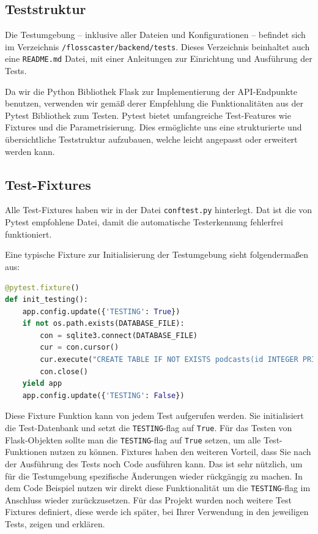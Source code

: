 \documentclass{article}
\begin{document}
\subsection{Teststruktur}
\begin{sloppypar}
Die Testumgebung – inklusive aller Dateien und Konfigurationen – befindet sich im Verzeichnis \texttt{/flosscaster/backend/tests}. Dieses Verzeichnis beinhaltet auch eine \texttt{README.md} Datei, mit einer Anleitungen zur Einrichtung und Ausführung der Tests. 
\end{sloppypar}

Da wir die Python Bibliothek Flask zur Implementierung der API-Endpunkte benutzen, verwenden wir gemäß derer Empfehlung die Funktionalitäten aus der Pytest Bibliothek zum Testen. Pytest bietet umfangreiche Test-Features wie Fixtures und die Parametrisierung. Dies ermöglichte uns eine strukturierte und übersichtliche Teststruktur aufzubauen, welche leicht angepasst oder erweitert werden kann.  

\subsection{Test-Fixtures}
Alle Test-Fixtures haben wir in der Datei \texttt{conftest.py} hinterlegt. Dat ist die von Pytest empfohlene Datei, damit die automatische Testerkennung fehlerfrei funktioniert. 

Eine typische Fixture zur Initialisierung der Testumgebung sieht folgendermaßen aus: 

\begin{lstlisting}[language=Python, caption=Beispiel einer Fixture]
@pytest.fixture() 
def init_testing(): 
    app.config.update({'TESTING': True}) 
    if not os.path.exists(DATABASE_FILE): 
        con = sqlite3.connect(DATABASE_FILE) 
        cur = con.cursor() 
        cur.execute("CREATE TABLE IF NOT EXISTS podcasts(id INTEGER PRIMARY KEY, title, description, date, filepath)") 
        con.close() 
    yield app 
    app.config.update({'TESTING': False}) 
\end{lstlisting}

Diese Fixture Funktion kann von jedem Test aufgerufen werden. Sie initialisiert die Test-Datenbank und setzt die \texttt{TESTING}-flag auf \texttt{True}. Für das Testen von Flask-Objekten sollte man die \texttt{TESTING}-flag auf \texttt{True} setzen, um alle Test-Funktionen nutzen zu können. Fixtures haben den weiteren Vorteil, dass Sie nach der Ausführung des Tests noch Code ausführen kann. Das ist sehr nützlich, um für die Testumgebung spezifische Änderungen wieder rückgängig zu machen. In dem Code Beispiel nutzen wir direkt diese Funktionalität um die \texttt{TESTING}-flag im Anschluss wieder zurückzusetzen. Für das Projekt wurden noch weitere Test Fixtures definiert, diese werde ich später, bei Ihrer Verwendung in den jeweiligen Tests, zeigen und erklären. 
\end{document}
